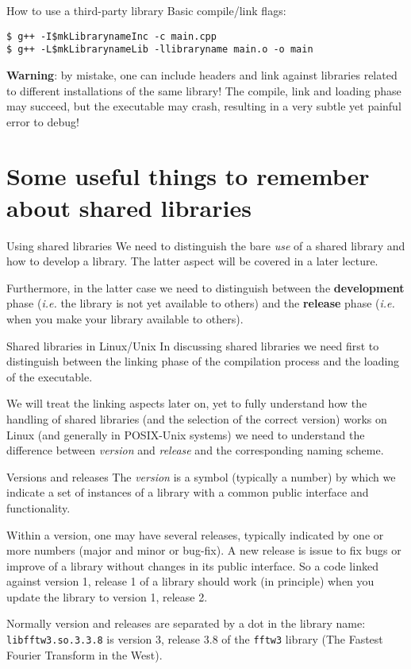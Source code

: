 \documentclass[10pt]{beamer}
\begin{document}
\begin{frame}[fragile]{How to use a third-party library}
  Basic compile/link flags:
\begin{verbatim}
$ g++ -I$mkLibrarynameInc -c main.cpp
$ g++ -L$mkLibrarynameLib -llibraryname main.o -o main
\end{verbatim}
\bigskip
\textbf{Warning}: by mistake, one can include headers and link against libraries related to different installations of the same library! The compile, link and loading phase may succeed, but the executable may crash, resulting in a very subtle yet painful error to debug!
\end{frame}

\section{Some useful things to remember about shared libraries}

\begin{frame}{Using shared libraries}
  We need to distinguish the bare \emph{use} of a shared library and how
  to develop a library. The latter aspect will be covered in a later lecture.
  \medskip

  Furthermore, in the latter case we need to distinguish between the
  \textbf{development} phase (\textit{i.e.} the library is not yet available to others) and the \textbf{release} phase (\textit{i.e.} when you make your
  library available to others).
\end{frame}


\begin{frame}{Shared libraries in Linux/Unix} In
  discussing shared libraries we need first to distinguish between the
  linking phase of the compilation process and the loading of the
  executable. 
  \medskip

  We will treat the linking aspects later on, yet to fully understand
  how the handling of shared libraries (and the selection of the correct
  version) works on Linux (and generally in POSIX-Unix systems) we need
  to understand the difference between \emph{version} and \emph{release}
  and the corresponding naming scheme.
\end{frame}

\begin{frame}{Versions and releases} 
  The \emph{version} is a symbol
  (typically a number) by which we indicate a set of instances of a
  library with a common public interface and functionality.
  \smallskip

  Within a version, one may have several releases, typically indicated
  by one or more numbers (major and minor or bug-fix). A new release is 
  issue to fix bugs  or improve of a library without
  changes in its public interface. So a code linked against version 1,
  release 1 of a library should work (in principle) when you update
  the library to version 1, release 2.
  \smallskip

  Normally version and releases are separated by a dot in the library name:
  \texttt{libfftw3.so.3.3.8} is version 3, release 3.8 of the
  \texttt{fftw3} library (The Fastest Fourier Transform in the West).
\end{frame}
\end{document}
